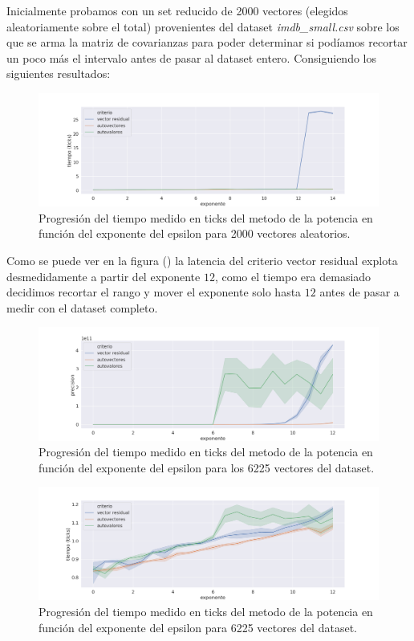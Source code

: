 Inicialmente probamos con un set reducido de 2000 vectores (elegidos aleatoriamente sobre el total) provenientes del dataset \textit{ imdb\_small.csv} sobre los que se arma la matriz de covarianzas para poder determinar si podíamos recortar un poco más el intervalo antes de pasar al dataset entero. Consiguiendo los siguientes resultados:

\begin{figure}[h]
\includegraphics[width=\textwidth]{./img/tiempo_2k.png}
\centering
\caption{Progresión del tiempo medido en ticks del metodo de la potencia en función del exponente del epsilon para 2000 vectores aleatorios.}
\end{figure}

Como se puede ver en la figura () la latencia del criterio vector residual explota desmedidamente a partir del exponente $12$, como el tiempo era demasiado decidimos recortar el rango y mover el exponente solo hasta $12$ antes de pasar a medir con el dataset completo.

\begin{figure}[h]
\includegraphics[width=\textwidth]{./img/precision_grande_full.png}
\centering
\caption{Progresión del tiempo medido en ticks del metodo de la potencia en función del exponente del epsilon para los 6225 vectores del dataset.}
\end{figure}

\begin{figure}[h]
\includegraphics[width=\textwidth]{./img/tiempo_grande_full.png}
\centering
\caption{Progresión del tiempo medido en ticks del metodo de la potencia en función del exponente del epsilon para 6225 vectores del dataset.}
\end{figure}

